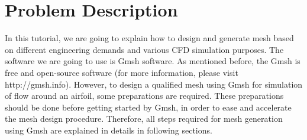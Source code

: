 \section{Problem Description}
In this tutorial, we are going to explain how to design and generate mesh based on different engineering demands and various CFD simulation purposes. The software we are going to use is Gmsh software. As mentioned before, the Gmsh is free and open-source software (for more information, please visit http://gmsh.info). However, to design a qualified mesh using Gmsh for simulation of flow around an airfoil, some preparations are required. These preparations should be done before getting started by Gmsh, in order to ease and accelerate the mesh design procedure. Therefore, all steps required for mesh generation using Gmsh are explained in details in following sections.
